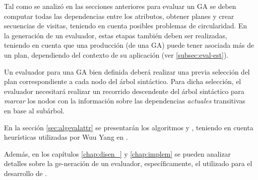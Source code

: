 Tal como se analizó en las secciones anteriores para evaluar un GA se deben computar todas las dependencias entre los atributos, obtener planes y crear secuencias de visitas, teniendo en cuenta posibles problemas de circularidad. En la generación de un evaluador, estas etapas también deben ser realizadas, teniendo en cuenta que una producción (de una GA) puede tener asociada más de un plan, dependiendo del contexto de su aplicación (ver \ref{subsec:eval-est}). 

Un evaluador para una GA bien definida deberá realizar una previa selección del plan correspondiente a cada nodo del árbol sintáctico. Para dicha selección, el evaluador necesitará realizar un recorrido descendente del árbol sintáctico para \emph{marcar} los nodos con la información sobre las dependencias \emph{actuales} transitivas en base al subárbol.

En la sección \ref{sec:algevalattr} se presentarán los algoritmos  y , teniendo en cuenta heurísticas utilizadas por Wuu Yang en \cite{wuu-yang1}.

Además, en los capítulos \ref{chap:disen_} y \ref{chap:implem} se pueden analizar detalles sobre la ge-neración de un evaluador, específicamente, el utilizado para el desarrollo de \maggen.
